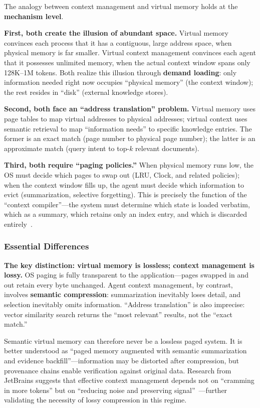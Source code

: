 \documentclass[11pt,a4paper]{article}
\begin{document}
The analogy between context management and virtual memory holds at the \textbf{mechanism level}.

\textbf{First, both create the illusion of abundant space.}
Virtual memory convinces each process that it has a contiguous, large address space, when physical memory is far smaller.
Virtual context management convinces each agent that it possesses unlimited memory, when the actual context window spans only 128K--1M tokens.
Both realize this illusion through \textbf{demand loading}: only information needed right now occupies ``physical memory'' (the context window); the rest resides in ``disk'' (external knowledge stores).

\textbf{Second, both face an ``address translation'' problem.}
Virtual memory uses page tables to map virtual addresses to physical addresses; virtual context uses semantic retrieval to map ``information needs'' to specific knowledge entries.
The former is an exact match (page number to physical page number); the latter is an approximate match (query intent to top-$k$ relevant documents).

\textbf{Third, both require ``paging policies.''}
When physical memory runs low, the OS must decide which pages to swap out (LRU, Clock, and related policies); when the context window fills up, the agent must decide which information to evict (summarization, selective forgetting).
This is precisely the function of the ``context compiler''---the system must determine which state is loaded verbatim, which as a summary, which retains only an index entry, and which is discarded entirely~\cite{contextcompiler2025}.

\subsubsection{Essential Differences}

\textbf{The key distinction: virtual memory is \textbf{lossless}; context management is \textbf{lossy}.}
OS paging is fully transparent to the application---pages swapped in and out retain every byte unchanged.
Agent context management, by contrast, involves \textbf{semantic compression}: summarization inevitably loses detail, and selection inevitably omits information.
``Address translation'' is also imprecise: vector similarity search returns the ``most relevant'' results, not the ``exact match.''

Semantic virtual memory can therefore never be a lossless paged system.
It is better understood as ``paged memory augmented with semantic summarization and evidence backfill''---information may be distorted after compression, but provenance chains enable verification against original data.
Research from JetBrains suggests that effective context management depends not on ``cramming in more tokens'' but on ``reducing noise and preserving signal''~\cite{jetbrains2025context}---further validating the necessity of lossy compression in this regime.
\end{document}
